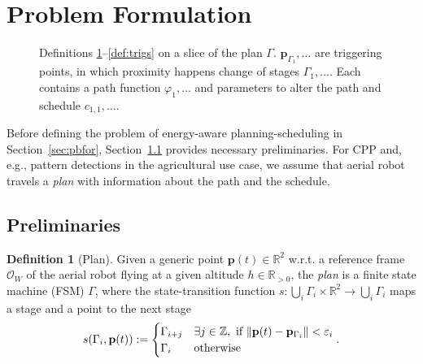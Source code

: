 \documentclass[letterpaper,10pt,journal,twoside]{IEEEtran}
\newcommand{\figpath}{./figures}
\DeclarePairedDelimiter\norm{\lVert}{\rVert}%
\theoremstyle{definition}
\newtheorem{defn}{Definition}[section]
\begin{document}
\section{Problem Formulation}  %
\label{sec:prob}               %
\begin{figure}[t]
  \footnotesize
  \begin{minipage}[l]{0.35\columnwidth}
    \caption{Definitions \ref{def:plan}--\ref{def:trigs} on a slice of the plan $\Gamma$. $\mathbf{p}_{\Gamma_1},\dots$ are triggering points, in which proximity happens change of stages $\Gamma_1,\dots$. Each contains a path function $\varphi_1,\dots$ and parameters to alter the path and schedule $c_{1,1},\dots$.}
    \label{fig:traj1}
  \end{minipage}\hfill
  \begin{minipage}[c]{0.6\columnwidth}
    \centering
    \vspace*{-4.5ex}
    
  \end{minipage}
  \vspace*{-3.5ex}
\end{figure}

Before defining the problem of energy-aware planning-scheduling in Section~\ref{sec:pbfor}, Section~\ref{sec:prelim} provides necessary preliminaries. For CPP and, e.g., pattern detections in the agricultural use case, we assume that aerial robot travels a \emph{plan} with information about the path and the schedule.




\subsection{Preliminaries}
\label{sec:prelim}

\begin{defn}[Plan]\label{def:plan}
  Given a generic point $\mathbf{p}(t)\in\mathbb{R}^2$ w.r.t. a reference frame $\mathcal{O}_W$ of the aerial robot flying at a given altitude $h\in\mathbb{R}_{>0}$, the \emph{plan} is a finite state machine (FSM) $\Gamma$, where the state-transition function $s:\bigcup_i{\Gamma_i}\times\mathbb{R}^2\rightarrow\bigcup_i{\Gamma_i}$ maps a stage and a point to the next stage
  \begin{equation*}s(\Gamma_i,\mathbf{p}(t)):=\begin{cases}
    \Gamma_{i+j} & \exists j\in\mathbb{Z},\text{ if }\norm{\mathbf{p}(t)-\mathbf{p}_{\Gamma_i}}<\varepsilon_i\\
    \Gamma_i & \text{otherwise}
  \end{cases}.\end{equation*}
\end{defn}
\end{document}
